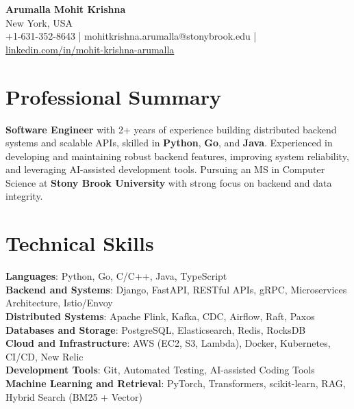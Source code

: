 \documentclass[letterpaper,11pt]{article}
\begin{document}
\begin{center}
  {\Large \textbf{Arumalla Mohit Krishna}} \\
  New York, USA \\
  +1-631-352-8643 \enspace | \enspace mohitkrishna.arumalla@stonybrook.edu \enspace | \enspace \href{https://www.linkedin.com/in/mohit-krishna-arumalla}{linkedin.com/in/mohit-krishna-arumalla}
\end{center}

\section{Professional Summary}
  \begin{itemize}[leftmargin=0.15in, label={}]
    \small{\item{
     \textbf{Software Engineer} with 2+ years of experience building distributed backend systems and scalable APIs, skilled in \textbf{Python}, \textbf{Go}, and \textbf{Java}. Experienced in developing and maintaining robust backend features, improving system reliability, and leveraging AI-assisted development tools. Pursuing an MS in Computer Science at \textbf{Stony Brook University} with strong focus on backend and data integrity.
    }}
  \end{itemize}
\vspace{-16pt}

\section{Technical Skills}
 \begin{itemize}[leftmargin=0.15in, label={}]
    \small{\item{
     \textbf{Languages}: Python, Go, C/C++, Java, TypeScript \\
     \textbf{Backend and Systems}: Django, FastAPI, RESTful APIs, gRPC, Microservices Architecture, Istio/Envoy \\
     \textbf{Distributed Systems}: Apache Flink, Kafka, CDC, Airflow, Raft, Paxos \\
     \textbf{Databases and Storage}: PostgreSQL, Elasticsearch, Redis, RocksDB \\
     \textbf{Cloud and Infrastructure}: AWS (EC2, S3, Lambda), Docker, Kubernetes, CI/CD, New Relic \\
     \textbf{Development Tools}: Git, Automated Testing, AI-assisted Coding Tools \\
     \textbf{Machine Learning and Retrieval}: PyTorch, Transformers, scikit-learn, RAG, Hybrid Search (BM25 + Vector)
    }}
 \end{itemize}
\vspace{-16pt}
\end{document}
